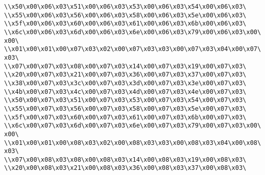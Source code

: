\verb|\\x50\x00\x06\x03\x51\x00\x06\x03\x53\x00\x06\x03\x54\x00\x06\x03\|\newline
\verb|\\x55\x00\x06\x03\x56\x00\x06\x03\x58\x00\x06\x03\x5e\x00\x06\x03\|\newline
\verb|\\x5f\x00\x06\x03\x60\x00\x06\x03\x61\x00\x06\x03\x6b\x00\x06\x03\|\newline
\verb|\\x6c\x00\x06\x03\x6d\x00\x06\x03\x6e\x00\x06\x03\x79\x00\x06\x03\x00\x00\|\newline
\verb|\\x01\x00\x01\x00\x07\x03\x02\x00\x07\x03\x03\x00\x07\x03\x04\x00\x07\x03\|\newline
\verb|\\x07\x00\x07\x03\x08\x00\x07\x03\x14\x00\x07\x03\x19\x00\x07\x03\|\newline
\verb|\\x20\x00\x07\x03\x21\x00\x07\x03\x36\x00\x07\x03\x37\x00\x07\x03\|\newline
\verb|\\x38\x00\x07\x03\x3c\x00\x07\x03\x3d\x00\x07\x03\x3e\x00\x07\x03\|\newline
\verb|\\x4b\x00\x07\x03\x4c\x00\x07\x03\x4d\x00\x07\x03\x4e\x00\x07\x03\|\newline
\verb|\\x50\x00\x07\x03\x51\x00\x07\x03\x53\x00\x07\x03\x54\x00\x07\x03\|\newline
\verb|\\x55\x00\x07\x03\x56\x00\x07\x03\x58\x00\x07\x03\x5e\x00\x07\x03\|\newline
\verb|\\x5f\x00\x07\x03\x60\x00\x07\x03\x61\x00\x07\x03\x6b\x00\x07\x03\|\newline
\verb|\\x6c\x00\x07\x03\x6d\x00\x07\x03\x6e\x00\x07\x03\x79\x00\x07\x03\x00\x00\|\newline
\verb|\\x01\x00\x01\x00\x08\x03\x02\x00\x08\x03\x03\x00\x08\x03\x04\x00\x08\x03\|\newline
\verb|\\x07\x00\x08\x03\x08\x00\x08\x03\x14\x00\x08\x03\x19\x00\x08\x03\|\newline
\verb|\\x20\x00\x08\x03\x21\x00\x08\x03\x36\x00\x08\x03\x37\x00\x08\x03\|\newline
